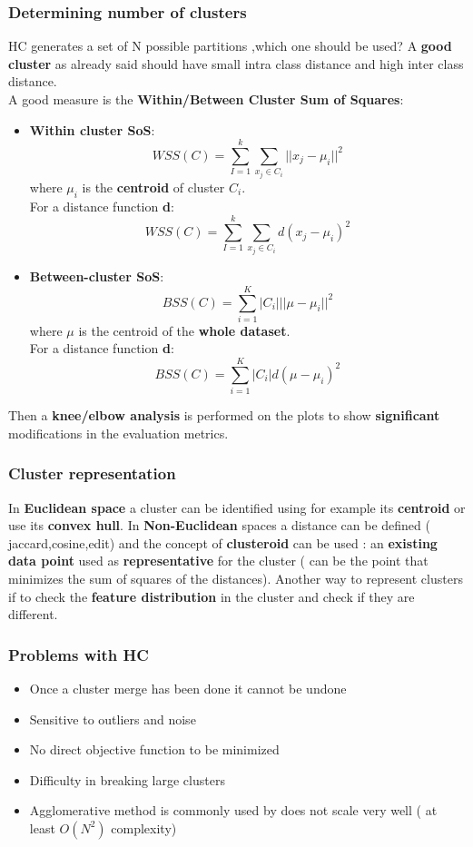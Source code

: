 \subsubsection{Determining number of clusters}
HC generates a set of N possible partitions ,which one should be used?
A \textbf{good cluster} as already said should have small intra class distance and high inter class distance.\\
A good measure is the \textbf{Within/Between Cluster Sum of Squares}:
\begin{itemize}
\item \textbf{Within cluster SoS}:
$$ WSS(C) = \sum \limits_{I=1}^{k} \sum_{x_j \in C_i}|| x_j - \mu_i||^2 $$
where $\mu_i$ is the \textbf{centroid} of cluster $C_i$.\\
For a distance function \textbf{d}:
$$ WSS(C) = \sum \limits_{I=1}^{k} \sum_{x_j \in C_i}d( x_j - \mu_i)^2 $$

\item \textbf{Between-cluster SoS}:
$$ BSS(C) = \sum \limits_{i=1}^{K}|C_i|||\mu - \mu_i||^2$$
where $\mu$ is the centroid of the \textbf{whole dataset}.\\
For a distance function \textbf{d}:
$$ BSS(C) = \sum \limits_{i=1}^{K}|C_i|d(\mu - \mu_i)^2$$
\end{itemize}
Then a \textbf{knee/elbow analysis} is performed on the plots to show \textbf{significant} modifications in the evaluation metrics.

\subsubsection{Cluster representation}
In \textbf{Euclidean space} a cluster can be identified using for example its \textbf{centroid} or use its \textbf{convex hull}. In \textbf{Non-Euclidean} spaces a distance can be defined ( jaccard,cosine,edit) and the concept of \textbf{clusteroid} can be used : an \textbf{existing data point} used  as \textbf{representative} for the cluster ( can be the point that minimizes the sum of squares of the distances).
Another way to represent clusters if to check the \textbf{feature distribution} in the cluster and check if they are different.

\subsubsection{Problems with HC}
\begin{itemize}
\item Once a cluster merge has been done it cannot be undone
\item Sensitive to outliers and noise
\item No direct objective function to be minimized
\item Difficulty in breaking large clusters
\item Agglomerative method is commonly used by does not scale very well ( at least $O(N^2)$ complexity)
\end{itemize}

